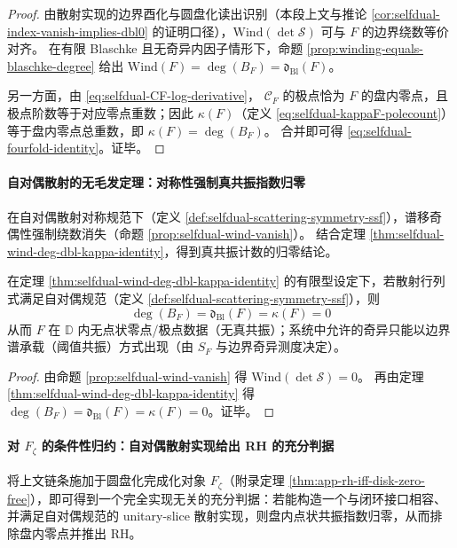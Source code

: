 \begin{proof}
由散射实现的边界酉化与圆盘化读出识别（本段上文与推论 \ref{cor:selfdual-index-vanish-implies-dbl0} 的证明口径），\(\mathrm{Wind}(\det\mathcal S)\) 可与 \(F\) 的边界绕数等价对齐。
在有限 Blaschke 且无奇异内因子情形下，命题 \ref{prop:winding-equals-blaschke-degree} 给出
\(\mathrm{Wind}(F)=\deg(B_F)=\mathfrak d_{\mathrm{Bl}}(F)\)。
\par
另一方面，由 \eqref{eq:selfdual-CF-log-derivative}，
\(\mathscr{C}_F\) 的极点恰为 \(F\) 的盘内零点，且极点阶数等于对应零点重数；因此 \(\kappa(F)\)（定义 \eqref{eq:selfdual-kappaF-polecount}）等于盘内零点总重数，即 \(\kappa(F)=\deg(B_F)\)。
合并即可得 \eqref{eq:selfdual-fourfold-identity}。证毕。
\end{proof}

\paragraph{自对偶散射的无毛发定理：对称性强制真共振指数归零}
在自对偶散射对称规范下（定义 \ref{def:selfdual-scattering-symmetry-ssf}），谱移奇偶性强制绕数消失（命题 \ref{prop:selfdual-wind-vanish}）。
结合定理 \ref{thm:selfdual-wind-deg-dbl-kappa-identity}，得到真共振计数的归零结论。

\begin{corollary}\label{cor:selfdual-implies-kappa0}
在定理 \ref{thm:selfdual-wind-deg-dbl-kappa-identity} 的有限型设定下，若散射行列式满足自对偶规范（定义 \ref{def:selfdual-scattering-symmetry-ssf}），则
\[
\boxed{\;
\deg(B_F)=\mathfrak d_{\mathrm{Bl}}(F)=\kappa(F)=0\;}
\]
从而 \(F\) 在 \(\mathbb{D}\) 内无点状零点/极点数据（无真共振）；系统中允许的奇异只能以边界谱承载（阈值共振）方式出现（由 \(S_F\) 与边界奇异测度决定）。
\end{corollary}

\begin{proof}
由命题 \ref{prop:selfdual-wind-vanish} 得 \(\mathrm{Wind}(\det\mathcal S)=0\)。
再由定理 \ref{thm:selfdual-wind-deg-dbl-kappa-identity} 得 \(\deg(B_F)=\mathfrak d_{\mathrm{Bl}}(F)=\kappa(F)=0\)。证毕。
\end{proof}

\paragraph{对 \texorpdfstring{$F_{\zeta}$}{Fzeta} 的条件性归约：自对偶散射实现给出 RH 的充分判据}
将上文链条施加于圆盘化完成化对象 \(F_{\zeta}\)（附录定理 \ref{thm:app-rh-iff-disk-zero-free}），即可得到一个完全实现无关的充分判据：若能构造一个与闭环接口相容、并满足自对偶规范的 unitary-slice 散射实现，则盘内点状共振指数归零，从而排除盘内零点并推出 RH。

